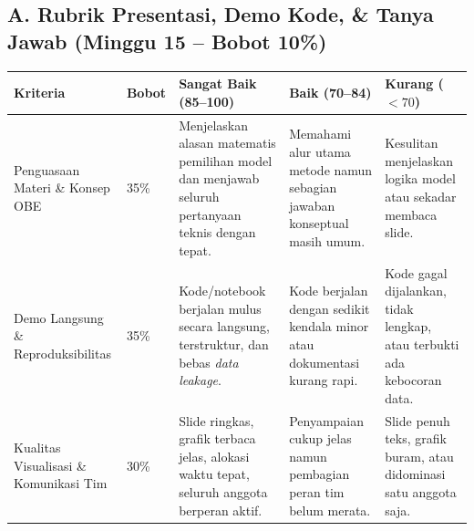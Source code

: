 \documentclass[11pt,a4paper]{article}
\newcommand{\hdr}[1]{\cellcolor{headerrow}\color{white}\textbf{#1}}
\begin{document}
\subsection{A. Rubrik Presentasi, Demo Kode, \& Tanya Jawab (Minggu 15 -- Bobot 10\%)}
{\footnotesize
\setlength{\tabcolsep}{4pt}
\begin{tabular}{|p{3.0cm}|p{0.9cm}|p{3.8cm}|p{3.8cm}|p{3.5cm}|}
\hline
\hdr{Kriteria} & \hdr{Bobot} & \hdr{Sangat Baik (85--100)} & \hdr{Baik (70--84)} & \hdr{Kurang ($<70$)} \\ \hline
Penguasaan Materi \& Konsep OBE & 35\% & Menjelaskan alasan matematis pemilihan model dan menjawab seluruh pertanyaan teknis dengan tepat. & Memahami alur utama metode namun sebagian jawaban konseptual masih umum. & Kesulitan menjelaskan logika model atau sekadar membaca slide. \\ \hline
Demo Langsung \& Reproduksibilitas & 35\% & Kode/notebook berjalan mulus secara langsung, terstruktur, dan bebas \textit{data leakage}. & Kode berjalan dengan sedikit kendala minor atau dokumentasi kurang rapi. & Kode gagal dijalankan, tidak lengkap, atau terbukti ada kebocoran data. \\ \hline
Kualitas Visualisasi \& Komunikasi Tim & 30\% & Slide ringkas, grafik terbaca jelas, alokasi waktu tepat, seluruh anggota berperan aktif. & Penyampaian cukup jelas namun pembagian peran tim belum merata. & Slide penuh teks, grafik buram, atau didominasi satu anggota saja. \\ \hline
\end{tabular}
}

\vspace{0.25cm}
\end{document}
